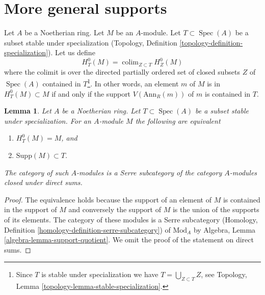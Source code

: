 \documentclass{stacks-project}
\theoremstyle{plain}
\newtheorem{lemma}[subsection]{Lemma}
\theoremstyle{definition}
\theoremstyle{remark}
\numberwithin{equation}{subsection}
\def\colim{\mathop{\mathrm{colim}}\nolimits}
\def\Spec{\mathop{\mathrm{Spec}}}
\begin{document}
\section{More general supports}
\label{section-supports}

\noindent
Let $A$ be a Noetherian ring. Let $M$ be an $A$-module.
Let $T \subset \Spec(A)$ be a subset stable under specialization
(Topology, Definition \ref{topology-definition-specialization}).
Let us define
$$
H^0_T(M) = \colim_{Z \subset T} H^0_Z(M)
$$
where the colimit is over the directed partially ordered set of
closed subsets $Z$ of $\Spec(A)$ contained in
$T$\footnote{Since $T$ is stable under specialization
we have $T = \bigcup_{Z \subset T} Z$, see
Topology, Lemma \ref{topology-lemma-stable-specialization}.}.
In other words, an element $m$ of $M$ is in $H^0_T(M) \subset M$
if and only if the support $V(\text{Ann}_R(m))$ of $m$
is contained in $T$.

\begin{lemma}
\label{lemma-support}
Let $A$ be a Noetherian ring. Let $T \subset \Spec(A)$ be a subset stable
under specialization. For an $A$-module $M$ the following are equivalent
\begin{enumerate}
\item $H^0_T(M) = M$, and
\item $\text{Supp}(M) \subset T$.
\end{enumerate}
The category of such $A$-modules is a Serre subcategory
of the category $A$-modules closed under direct sums.
\end{lemma}

\begin{proof}
The equivalence holds because the support of an element of $M$
is contained in the support of $M$ and conversely the support of
$M$ is the union of the supports of its elements.
The category of these modules is a Serre subcategory
(Homology, Definition \ref{homology-definition-serre-subcategory})
of $\text{Mod}_A$ by
Algebra, Lemma \ref{algebra-lemma-support-quotient}.
We omit the proof of the statement on direct sums.
\end{proof}
\end{document}
